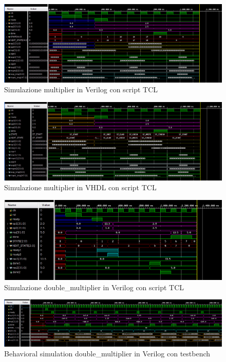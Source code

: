 \documentclass[]{IEEEtran}
\begin{document}
\begin{figure}[bt]
    \centering
    \includegraphics[width=\textwidth]{figures/sim_mult_verilog}
    \caption{Simulazione multiplier in Verilog con script TCL}
    \label{fig:SIM_MULT_VERILOG}
\end{figure}

\begin{figure}[bt]
    \centering
    \includegraphics[width=\textwidth]{figures/sim_mult_vhdl}
    \caption{Simulazione multiplier in VHDL con script TCL}
    \label{fig:SIM_MULT_VHDL}
\end{figure}

\begin{figure}[bt]
    \centering
    \includegraphics[width=\textwidth]{figures/sim_dm}
    \caption{Simulazione double\_multiplier in Verilog con script TCL}
    \label{fig:SIM_DM}
\end{figure}

\begin{figure}[bt]
    \centering
    \includegraphics[width=\textwidth]{figures/sim_tb_bh}
    \caption{Behavioral simulation double\_multiplier in Verilog con testbench}
    \label{fig:SIM_TB_BH}
\end{figure}
\end{document}
